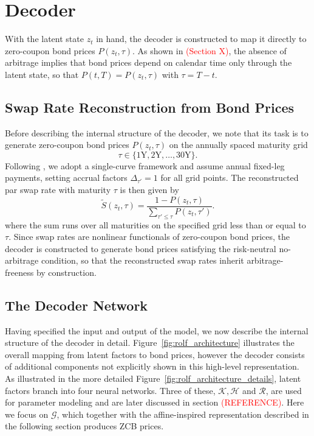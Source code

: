 \section{Decoder}

With the latent state $z_t$ in hand, the decoder is constructed to map it directly to zero-coupon bond prices $P(z_t,\tau)$. As shown in \textcolor{red}{(Section X)}, the absence of arbitrage implies that bond prices depend on calendar time only through the latent state, so that $P(t,T)=P(z_t,\tau)$ with $\tau=T-t$. 

\subsection{Swap Rate Reconstruction from Bond Prices}

Before describing the internal structure of the decoder, we note that its task is to generate zero-coupon bond prices $P(z_t,\tau)$ on the annually spaced maturity grid
\[
\tau \in \{1\text{Y},2\text{Y},\dots,30\text{Y}\}.
\]
Following \cite{MatinWanPoulsen2025}, we adopt a single-curve framework and assume annual fixed-leg payments, setting accrual factors $\Delta_{\tau'}=1$ for all grid points. The reconstructed par swap rate with maturity $\tau$ is then given by
\begin{equation}
\tilde{S}(z_t,\tau)
=
\frac{1-P(z_t,\tau)}
{\sum_{\tau' \leq \tau} P(z_t,\tau')}.
\label{estimatedswaprates}
\end{equation}
where the sum runs over all maturities on the specified grid less than or equal to $\tau$. Since swap rates are nonlinear functionals of zero-coupon bond prices, the decoder is constructed to generate bond prices satisfying the risk-neutral no-arbitrage condition, so that the reconstructed swap rates inherit arbitrage-freeness by construction.


\subsection{The Decoder Network}
Having specified the input and output of the model, we now describe the internal structure of the decoder in detail. Figure~\ref{fig:rolf_architecture} illustrates the overall mapping from latent factors to bond prices, however the decoder consists of additional components not explicitly shown in this high-level representation. As illustrated in the more detailed Figure~\ref{fig:rolf_architecture_details}, latent factors branch into four neural networks. Three of these, $\mathcal{K},\mathcal{H}$ and $\mathcal{R}$, are used for parameter modeling and are later discussed in section \textcolor{red}{(REFERENCE)}. Here we focus on $\mathcal{G}$, which together with the affine-inspired representation described in the following section produces ZCB prices.

